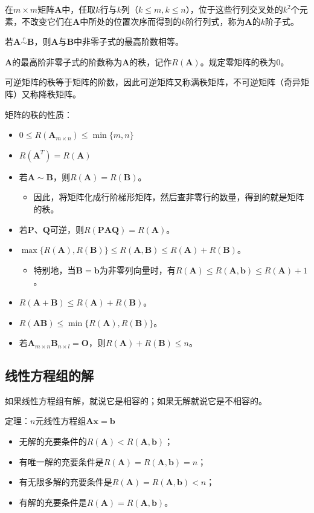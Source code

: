 \documentclass[12pt, a4paper, oneside]{ctexart}
\begin{document}
在$m\times m$矩阵$\mathbf{A}$中，任取$k$行与$k$列（$k\leq m,k\leq n$），位于这些行列交叉处的$k^2$个元素，不改变它们在$\mathbf{A}$中所处的位置次序而得到的$k$阶行列式，称为$\mathbf{A}$的$k$阶子式。

若$\mathbf{A}\overset{r}{\sim}\mathbf{B}$，则$\mathbf{A}$与$\mathbf{B}$中非零子式的最高阶数相等。

$\mathbf{A}$的最高阶非零子式的阶数称为$\mathbf{A}$的秩，记作$R(\mathbf{A})$。规定零矩阵的秩为0。

可逆矩阵的秩等于矩阵的阶数，因此可逆矩阵又称满秩矩阵，不可逆矩阵（奇异矩阵）又称降秩矩阵。

矩阵的秩的性质：
\begin{itemize}
  \item $0\leq R(\mathbf{A}_{m\times n})\leq\min\{m, n\}$
  \item $R(\mathbf{A}^T)=R(\mathbf{A})$
  \item 若$\mathbf{A}\sim\mathbf{B}$，则$R(\mathbf{A})=R(\mathbf{B})$。
  \begin{itemize}
    \item 因此，将矩阵化成行阶梯形矩阵，然后查非零行的数量，得到的就是矩阵的秩。
  \end{itemize}
  \item 若$\mathbf{P}$、$\mathbf{Q}$可逆，则$R(\mathbf{PAQ})=R(\mathbf{A})$。
  \item $\max\{R(\mathbf{A}),R(\mathbf{B})\}\leq R(\mathbf{A},\mathbf{B})\leq R(\mathbf{A})+R(\mathbf{B})$。
  \begin{itemize}
    \item 特别地，当$\mathbf{B}=\mathbf{b}$为非零列向量时，有$R(\mathbf{A})\leq R(\mathbf{A},\mathbf{b})\leq R(\mathbf{A})+1$。
  \end{itemize}
  \item $R(\mathbf{A}+\mathbf{B})\leq R(\mathbf{A})+R(\mathbf{B})$。
  \item $R(\mathbf{AB})\leq\min\{R(\mathbf{A}),R(\mathbf{B})\}$。
  \item 若$\mathbf{A}_{m\times n}\mathbf{B}_{n\times l}=\mathbf{O}$，则$R(\mathbf{A})+R(\mathbf{B})\leq n$。
\end{itemize}

\subsection{线性方程组的解}

如果线性方程组有解，就说它是相容的；如果无解就说它是不相容的。

定理：$n$元线性方程组$\mathbf{Ax}=\mathbf{b}$
\begin{itemize}
  \item 无解的充要条件的$R(\mathbf{A})<R(\mathbf{A},\mathbf{b})$；
  \item 有唯一解的充要条件是$R(\mathbf{A})=R(\mathbf{A},\mathbf{b})=n$；
  \item 有无限多解的充要条件是$R(\mathbf{A})=R(\mathbf{A},\mathbf{b})<n$；
  \item 有解的充要条件是$R(\mathbf{A})=R(\mathbf{A},\mathbf{b})$。
\end{itemize}
\end{document}
